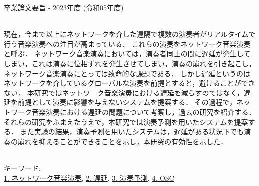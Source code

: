 卒業論文要旨 - 2023年度 (令和05年度)
\begin{center}
\begin{large}
\end{large}
\end{center}

~ \\

現在，今まで以上にネットワークを介した遠隔で複数の演奏者がリアルタイムで行う音楽演奏への注目が高まっている．
これらの演奏をネットワーク音楽演奏と呼ぶ．
ネットワーク音楽演奏においては，演奏者同士の間に遅延が発生してしまい，これは演奏に位相ずれを発生させてしまい，演奏の崩れを引き起こし，ネットワーク音楽演奏にとっては致命的な課題である．
しかし遅延というのはネットワークを介しているグローバルな演奏を前提とすると，避けることができない．
本研究ではネットワーク音楽演奏における遅延を減らすのではなく，遅延を前提として演奏に影響を与えないシステムを提案する．
その過程で，ネットワーク音楽演奏における遅延の問題について考察し，過去の研究を紹介する．
それらの研究をふまえたうえで，本研究では演奏予測を用いたシステムを提案する．
また実験の結果，演奏予測を用いたシステムは，遅延がある状況下でも演奏の崩れを抑えることができることを示し，本研究の有効性を示した．

~ \\
キーワード:\\
\underline{1. ネットワーク音楽演奏},
\underline{2. 遅延},
\underline{3. 演奏予測},
\underline{4. OSC}
\begin{flushright}
\dept \\
\author
\end{flushright}
